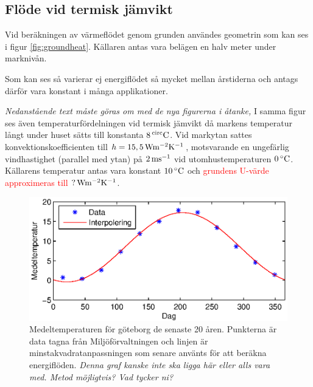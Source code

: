 \subsection{Flöde vid termisk jämvikt}

Vid beräkningen av värmeflödet genom grunden användes geometrin som kan ses i figur \ref{fig:groundheat}.
Källaren antas vara belägen en halv meter under marknivån.

Som kan ses så varierar ej energiflödet så mycket mellan årstiderna och antags därför vara konstant i många applikationer.


\emph{\color{red} Nedanstående text måste göras om med de nya figurerna i åtanke,}
I samma figur ses även temperaturfördelningen vid termisk jämvikt då markens temperatur långt under huset sätts till konstanta $\unit[8]{^{circ}C}$. Vid markytan sattes konvektionskoefficienten till $h=\unit[15,5]{Wm^{-2}K^{-1}}$, motsvarande en ungefärlig vindhastighet (parallel med ytan) på $\unit[2]{ms^{-1}}$ vid utomhustemperaturen $\unit[0]{^{\circ}C}$. Källarens temperatur antas vara konstant $\unit[10]{^{\circ}C}$ och \textcolor{red}{grundens U-värde approximeras till $\unit[?]{Wm^{-2}K^{-1}}$}.


\begin{figure}
\centering
\includegraphics{images/meantemperature.eps}
\caption{Medeltemperaturen för göteborg de senaste 20 åren. Punkterna är data tagna från Miljöförvaltningen
och linjen är minstakvadratanpassningen som senare använts för att beräkna energiflöden.
\emph{\color{red} Denna graf kanske inte ska ligga här eller alls vara med. Metod möjligtvis? Vad tycker ni?}}
\end{figure}

